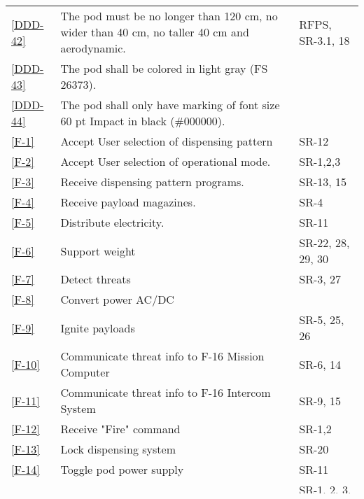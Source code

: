 \documentclass[Main]{subfiles}
\begin{document}
\begin{longtable}{l p{10.4cm} p{1.8cm} }
\ref{DDD-42} & The pod must be no longer than 120 cm, no wider than 40 cm, no taller 40 cm and aerodynamic. & RFPS, SR-3.1, 18\\

\ref{DDD-43} & The pod shall be colored in light gray (FS 26373). & \\

\ref{DDD-44} & The pod shall only have marking of font size 60 pt Impact in black (\#000000). & \\

\ref{F-1} & Accept User selection of dispensing pattern & SR-12\\

\ref{F-2} & Accept User selection of operational mode. & SR-1,2,3\\

\ref{F-3} & Receive dispensing pattern programs. & SR-13, 15\\

\ref{F-4} & Receive payload magazines. & SR-4\\

\ref{F-5} & Distribute electricity. & SR-11\\

\ref{F-6} & Support weight & SR-22, 28, 29, 30\\

\ref{F-7} & Detect threats & SR-3, 27 \\

\ref{F-8} & Convert power AC/DC & \\

\ref{F-9} & Ignite payloads & SR-5, 25, 26\\

\ref{F-10} & Communicate threat info to F-16 Mission Computer & SR-6, 14 \\

\ref{F-11} & Communicate threat info to F-16 Intercom System & SR-9, 15 \\

\ref{F-12} & Receive "Fire" command & SR-1,2 \\

\ref{F-13} & Lock dispensing system & SR-20\\

\ref{F-14} & Toggle pod power supply & SR-11 \\

\ref{F-15} & Validate "fire" command & SR-1, 2, 3, 11\\



\end{longtable}
\end{document}
